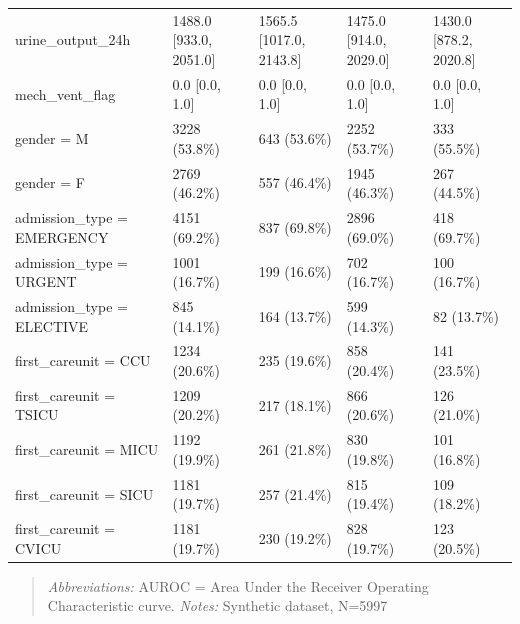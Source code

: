 \begin{table}[htbp]
\begin{tabular}{lllll}
urine\_output\_24h & 1488.0 [933.0, 2051.0] & 1565.5 [1017.0, 2143.8] & 1475.0 [914.0, 2029.0] & 1430.0 [878.2, 2020.8] \\
mech\_vent\_flag & 0.0 [0.0, 1.0] & 0.0 [0.0, 1.0] & 0.0 [0.0, 1.0] & 0.0 [0.0, 1.0] \\
gender = M & 3228 (53.8\%) & 643 (53.6\%) & 2252 (53.7\%) & 333 (55.5\%) \\
gender = F & 2769 (46.2\%) & 557 (46.4\%) & 1945 (46.3\%) & 267 (44.5\%) \\
admission\_type = EMERGENCY & 4151 (69.2\%) & 837 (69.8\%) & 2896 (69.0\%) & 418 (69.7\%) \\
admission\_type = URGENT & 1001 (16.7\%) & 199 (16.6\%) & 702 (16.7\%) & 100 (16.7\%) \\
admission\_type = ELECTIVE & 845 (14.1\%) & 164 (13.7\%) & 599 (14.3\%) & 82 (13.7\%) \\
first\_careunit = CCU & 1234 (20.6\%) & 235 (19.6\%) & 858 (20.4\%) & 141 (23.5\%) \\
first\_careunit = TSICU & 1209 (20.2\%) & 217 (18.1\%) & 866 (20.6\%) & 126 (21.0\%) \\
first\_careunit = MICU & 1192 (19.9\%) & 261 (21.8\%) & 830 (19.8\%) & 101 (16.8\%) \\
first\_careunit = SICU & 1181 (19.7\%) & 257 (21.4\%) & 815 (19.4\%) & 109 (18.2\%) \\
first\_careunit = CVICU & 1181 (19.7\%) & 230 (19.2\%) & 828 (19.7\%) & 123 (20.5\%) \\
\bottomrule
\end{tabular}

\end{table}


\begin{quote}\small
\textit{Abbreviations:} AUROC = Area Under the Receiver Operating Characteristic curve.
\textit{Notes:} Synthetic dataset, N=5997
\end{quote}